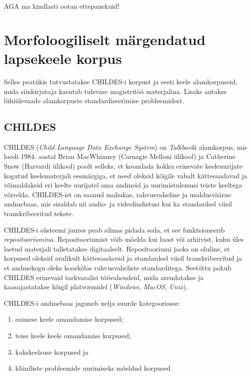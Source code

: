 \documentclass[12pt]{article}
\begin{document}
AGA ma kindlasti ootan ettepanekuid!



\newpage
\section{Morfoloogiliselt märgendatud lapsekeele korpus}

Selles peatükis tutvustatakse CHILDES-i korpust ja eesti keele alamkorpuseid, mida siinkirjutaja kasutab tulevase magistritöö materjalina. Lisaks antakse lühiülevaade alamkorpuste standardiseerimise probleemidest.

\subsection{CHILDES}
CHILDES (\emph{Child Language Data Exchange System}) on \emph{Talkbank}i alamkorpus, mis loodi 1984. aastal Brian MacWhinney (Carnagie Melloni ülikool) ja Catherine Snow (Harvardi ülikool) poolt selleks, et koondada kokku erinevate keeleuurijate kogutud keelematerjali eesmärgiga, et need oleksid kõigile vabalt kättesaadavad ja võimaldaksid eri keelte uurijatel oma andmeid ja uurimistulemusi teiste keeltega võrrelda. CHILDES-ist on saanud mahukas, rahvusvaheline ja usaldusväärne andmebaas, mis sisaldab nii audio- ja videolindistusi kui ka standardsel viisil transkribeeritud tekste. \citep[1]{Gillis}

CHILDES-i süsteemi juures peab silmas pidada seda, et see funktsioneerib \emph{repositooriumina}. Repositooriumist võib mõelda kui laost või arhiivist, kuhu üles laetud materjali talletatakse digitaalselt. Repositooriumi jaoks on oluline, et korpused oleksid avalikult kättesaadavad ja standardsel viisil transkribeeritud ja et andmekogu oleks kooskõlas rahvusvaheliste standarditega. Seetõttu pakub CHILDES erinevaid tarkvaralisi töövahendeid, mida arendatakse ja kaasajastatakse kõigil platvormidel (\emph{Windows}, \emph{MacOS}, \emph{Unix}). \citep[1]{Gillis}

CHILDES-i andmebaas jaguneb nelja suurde kategooriasse:
\begin{enumerate}
    \item esimese keele omandamise korpused;
    \item teise keele keele omandamise korpused;
    \item kakskeelsuse korpused ja 
    \item kliiniliste probleemide uurimiseks mõeldud korpused. \citep[1]{Gillis}
\end{enumerate}
\end{document}
